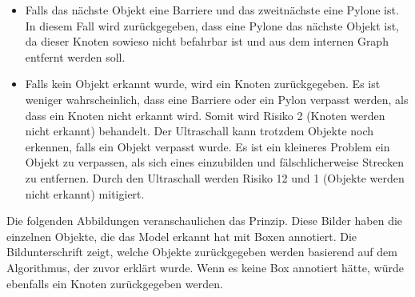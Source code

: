 \begin{itemize}
    \item Falls das nächste Objekt eine Barriere und das zweitnächste eine Pylone ist. In diesem Fall wird zurückgegeben, dass eine Pylone das nächste Objekt ist, da dieser Knoten sowieso nicht befahrbar ist und aus dem internen Graph entfernt werden soll.
    \item Falls kein Objekt erkannt wurde, wird ein Knoten zurückgegeben. Es ist weniger wahrscheinlich, dass eine Barriere oder ein Pylon verpasst werden, als dass ein Knoten nicht erkannt wird. Somit wird Risiko 2 (Knoten werden nicht erkannt) behandelt. Der Ultraschall kann trotzdem Objekte noch erkennen, falls ein Objekt verpasst wurde. Es ist ein kleineres Problem ein Objekt zu verpassen, als sich eines einzubilden und fälschlicherweise Strecken zu entfernen. Durch den Ultraschall werden Risiko 12 und 1 (Objekte werden nicht erkannt) mitigiert.
\end{itemize}

Die folgenden Abbildungen veranschaulichen das Prinzip. Diese Bilder haben die einzelnen Objekte, die das Model erkannt hat mit Boxen annotiert. Die Bildunterschrift zeigt, welche Objekte zurückgegeben werden basierend auf dem Algorithmus, der zuvor erklärt wurde. Wenn es keine Box annotiert hätte, würde ebenfalls ein Knoten zurückgegeben werden.

